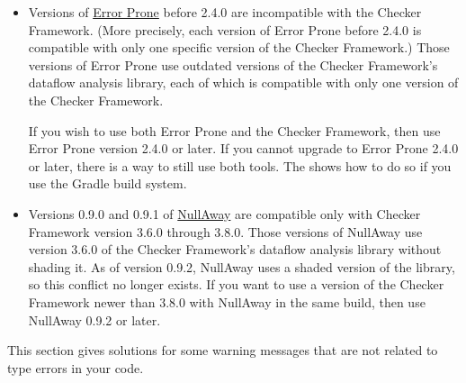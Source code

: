 \begin{itemize}
\item
Versions of \href{https://errorprone.info/}{Error Prone} before 2.4.0 are
incompatible with the Checker Framework.  (More precisely, each version of
Error Prone before 2.4.0 is compatible with only one specific version of
the Checker Framework.)  Those versions of Error Prone
use outdated versions of the Checker Framework's dataflow analysis
library, each of which is compatible with only one version of the Checker Framework.

If you wish to use both Error Prone and the Checker Framework, then use
Error Prone version 2.4.0 or later.
If you cannot upgrade to Error Prone 2.4.0 or later, there is a way to
still use both tools.  The
 shows how to do so if you use the Gradle build
system.

\item
Versions 0.9.0 and 0.9.1 of
\href{https://github.com/uber/NullAway}{NullAway} are compatible
only with Checker Framework version 3.6.0 through 3.8.0.  Those versions of
NullAway use version 3.6.0 of the Checker Framework's dataflow analysis
library without shading it.  As of version 0.9.2, NullAway uses a shaded version of
the library, so this conflict no longer exists.
If you want to use a version of the Checker Framework newer than 3.8.0 with
NullAway in the same build, then use NullAway 0.9.2 or later.

\end{itemize}



This section gives solutions for some warning messages that are not related
to type errors in your code.

